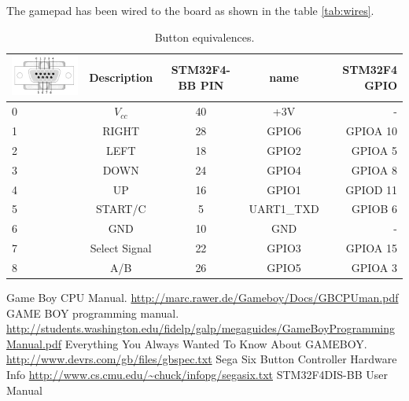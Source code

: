 \documentclass{article}
\begin{document}
The gamepad has been wired to the board as shown in the table \autoref{tab:wires}.


\begin{table}[!h]
  \centering
  \begin{tabular}{|l|c|c|c|r|}
    \hline
    \includegraphics[scale=.5]{gamepad_pins.png}
    & Description & STM32F4-BB PIN & name & STM32F4 GPIO \\
    \hline
    0 & $V_{cc}$      & 40 & +3V        & -        \\
    1 & RIGHT         & 28 & GPIO6      & GPIOA 10 \\
    2 & LEFT          & 18 & GPIO2      & GPIOA 5  \\
    3 & DOWN          & 24 & GPIO4      & GPIOA 8  \\
    4 & UP            & 16 & GPIO1      & GPIOD 11 \\
    5 & START/C       & 5  & UART1\_TXD & GPIOB 6  \\
    6 & GND           & 10 & GND        & -        \\
    7 & Select Signal & 22 & GPIO3      & GPIOA 15 \\
    8 & A/B           & 26 & GPIO5      & GPIOA 3  \\
    \hline
  \end{tabular}
  \caption{Button equivalences.}
  \label{tab:wires}
\end{table}

\begin{thebibliography}{9}
    Game Boy \texttrademark CPU Manual.
    \url{http://marc.rawer.de/Gameboy/Docs/GBCPUman.pdf}
    GAME BOY programming manual.
    \url{http://students.washington.edu/fidelp/galp/megaguides/GameBoyProgrammingManual.pdf}
    Everything You Always Wanted To Know About GAMEBOY.
    \url{http://www.devrs.com/gb/files/gbspec.txt}
    Sega Six Button Controller Hardware Info
    \url{http://www.cs.cmu.edu/~chuck/infopg/segasix.txt}
    STM32F4DIS-BB User Manual
\end{thebibliography}
\end{document}
